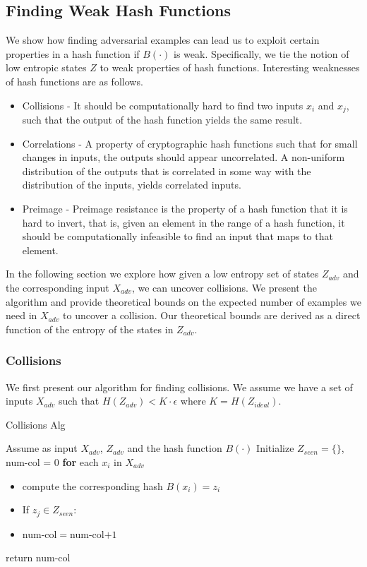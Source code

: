 \documentclass[letterpaper,twocolumn,10pt]{article}
\begin{document}
\subsection{Finding Weak Hash Functions}
We show how finding adversarial examples can lead us to exploit certain properties in a hash function if $B(\cdot)$ is weak. Specifically, we tie the notion of low entropic states $Z$ to weak properties of hash functions. Interesting weaknesses of hash functions are as follows.

\begin{itemize}
\item Collisions - It should be computationally hard to find two inputs $x_{i}$ and $x_{j}$, such that the output of the hash function yields the same result.
\item Correlations - A property of cryptographic hash functions such that for small changes in inputs, the outputs should appear uncorrelated. A non-uniform distribution of the outputs that is correlated in some way with the distribution of the inputs, yields correlated inputs. 
\item Preimage - Preimage resistance is the property of a hash function that it is hard to invert, that is, given an element in the range of a hash function, it should be computationally infeasible to find an input that maps to that element.
\end{itemize}

In the following section we explore how given a low entropy set of states $Z_{adv}$ and the corresponding input $X_{adv}$, we can uncover collisions. We present the algorithm and provide theoretical bounds on the expected number of examples we need in $X_{adv}$ to uncover a collision. Our theoretical bounds are derived as a direct function of the entropy of the states in $Z_{adv}$.  


\subsubsection{Collisions}
We first present our algorithm for finding collisions. We assume we have a set of inputs $X_{adv}$ such that $H(Z_{adv}) < K \cdot \epsilon$ where $K = H(Z_{ideal})$.

\begin{algorithm} \label{alg:col}
\caption{Collisions Alg}\label{sampling}
\begin{algorithmic}[1]
\State Assume as input $X_{adv}$, $Z_{adv}$ and the hash function $B(\cdot)$
\State Initialize $Z_{seen} = \{\}$, num-col = 0
\State \textbf{for} each $x_{i}$ in $X_{adv}$
\begin{itemize}
\item compute the corresponding hash $B(x_{i}) = z_{i}$
\item If $z_{j} \in Z_{seen}$:
\item  num-col$=$num-col$ + 1$
\end{itemize}
\item return num-col
\end{algorithmic}
\end{algorithm}
\end{document}
